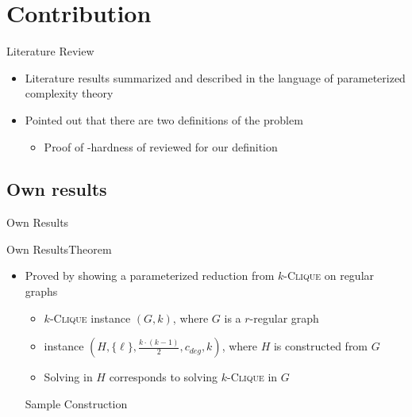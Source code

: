 \section{Contribution}

\begin{frame}{Literature Review}
    \begin{itemize}
        \item Literature results summarized and described in the language of parameterized complexity theory
        \item Pointed out that there are two definitions of the problem
        \begin{itemize}
            \item Proof of \NP-hardness of \HLdeg reviewed for our definition 
        \end{itemize}
    \end{itemize}
\end{frame}

\subsection
{Own results}

\begin{frame}{Own Results}
    
\end{frame}

\begin{frame}{Own Results}{Theorem}
    \begin{center}
    \end{center}
    \begin{center}
    \end{center}

    \begin{itemize}
        \item Proved by showing a parameterized reduction from $k$-\textsc{Clique} on regular graphs
        \begin{itemize}
            \item $k$-\textsc{Clique} instance $(G, k)$, where $G$ is a $r$-regular graph
            \item \HL instance $(H, \{\ell\}, \frac{k\cdot(k-1)}{2}, c_{deg}, k)$, where $H$ is constructed from $G$
            \item Solving \HL in $H$ corresponds to solving $k$-\textsc{Clique} in $G$
        \end{itemize}

\begin{frame}{Sample Construction}
    
\end{frame}
    \end{itemize}
\end{frame}

